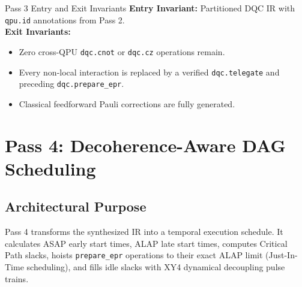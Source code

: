 \begin{passbox}{Pass 3 Entry and Exit Invariants}
\textbf{Entry Invariant:} Partitioned DQC IR with \texttt{qpu.id} annotations from Pass 2.\\
\textbf{Exit Invariants:}
\begin{itemize}
    \item Zero cross-QPU \texttt{dqc.cnot} or \texttt{dqc.cz} operations remain.
    \item Every non-local interaction is replaced by a verified \texttt{dqc.telegate} and preceding \texttt{dqc.prepare\_epr}.
    \item Classical feedforward Pauli corrections are fully generated.
\end{itemize}
\end{passbox}


\section{Pass 4: Decoherence-Aware DAG Scheduling}
\label{sec:pass4_scheduling}

\subsection{Architectural Purpose}
Pass 4 transforms the synthesized IR into a temporal execution schedule. It calculates ASAP early start times, ALAP late start times, computes Critical Path slacks, hoists \texttt{prepare\_epr} operations to their exact ALAP limit (Just-In-Time scheduling), and fills idle slacks with XY4 dynamical decoupling pulse trains.

